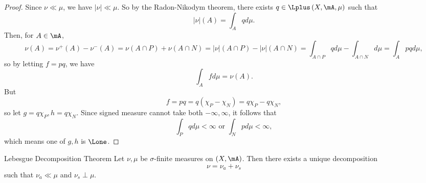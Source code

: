 \documentclass[pmath451]{subfiles}
\begin{document}
\begin{proof}
        Since $\nu\ll\mu$, we have $\left| \nu \right|\ll\mu$. So by the Radon-Nikodym theorem, there exists $q\in\Lplus\left( X,\mA,\mu \right)$ such that
        \begin{equation*}
            \left| \nu \right|\left( A \right) = \int_Aqd\mu.
        \end{equation*}
        Then, for $A\in\mA$,
        \begin{equation*}
            \nu\left( A \right) = \nu^+\left( A \right)-\nu^-\left( A \right) = \nu\left( A\cap P \right) + \nu\left( A\cap N \right) = \left| \nu \right|\left( A\cap P \right) - \left| \nu \right|\left( A\cap N \right) = \int_{A\cap P}qd\mu - \int_{A\cap N}d\mu = \int_Apqd\mu,
        \end{equation*}
        so by letting $f=pq$, we have
        \begin{equation*}
            \int_Afd\mu = \nu\left( A \right).
        \end{equation*}
        But
        \begin{equation*}
            f = pq = q\left( \chi_P-\chi_N \right) = q\chi_P - q\chi_N,
        \end{equation*}
        so let $g=q\chi_P, h=q\chi_N$. Since signed measure cannot take both $-\infty,\infty$, it follows that
        \begin{equation*}
            \int_Pqd\mu < \infty \text{ or } \int_Npd\mu < \infty,
        \end{equation*}
        which means one of $g,h$ is $\Lone$.
    \end{proof}
    
    \begin{theorem}{Lebesgue Decomposition Theorem}
        Let $\nu,\mu$ be $\sigma$-finite measures on $\left( X,\mA \right)$. Then there exists a unique decomposition
        \begin{equation*}
            \nu = \nu_a+\nu_s
        \end{equation*}
        such that $\nu_a\ll\mu$ and $\nu_s\perp\mu$.
    \end{theorem}
\end{document}
